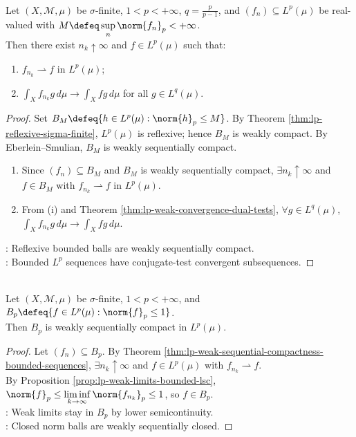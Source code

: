 \begin{theorem} \label{thm:lp-weak-sequential-compactness-bounded-sequences} \\
Let $(X,\mathcal M,\mu)$ be $\sigma$-finite, $1<p<+\infty$, $q=\frac{p}{p-1}$, and $(f_n)\subseteq L^p(\mu)$ be real-valued with $M\defeq\sup\limits_n\norm{f_n}_p<+\infty$.\\
Then there exist $n_k\uparrow\infty$ and $f\in L^p(\mu)$ such that:
\begin{enumerate}[label=(\roman*)]
\setlength{\itemsep}{0pt}
\item $f_{n_k}\rightharpoonup f$ in $L^p(\mu)$;
\item $\int_X f_{n_k}g\,d\mu\to\int_Xfg\,d\mu$ for all $g\in L^q(\mu)$.
\end{enumerate}
\begin{proof}
Set $B_M\defeq\{h\in L^p(\mu):\norm{h}_p\leq M\}$. By Theorem \ref{thm:lp-reflexive-sigma-finite}, $L^p(\mu)$ is reflexive; hence $B_M$ is weakly compact. By Eberlein--Smulian, $B_M$ is weakly sequentially compact.
\begin{enumerate}[label=(\roman*)]
\setlength{\itemsep}{0pt}
\item Since $(f_n)\subseteq B_M$ and $B_M$ is weakly sequentially compact, $\exists n_k\uparrow\infty$ and $f\in B_M$ with $f_{n_k}\rightharpoonup f$ in $L^p(\mu)$.
\item From (i) and Theorem \ref{thm:lp-weak-convergence-dual-tests}, $\forall g\in L^q(\mu)$, $\int_X f_{n_k}g\,d\mu\to\int_Xfg\,d\mu$.
\end{enumerate}
: Reflexive bounded balls are weakly sequentially compact.\\
: Bounded $L^p$ sequences have conjugate-test convergent subsequences.
\end{proof}
\end{theorem}

\begin{corollary} \label{cor:lp-closed-unit-ball-weakly-sequentially-compact} \\
Let $(X,\mathcal M,\mu)$ be $\sigma$-finite, $1<p<+\infty$, and $B_p\defeq\{f\in L^p(\mu):\norm{f}_p\leq1\}$.\\
Then $B_p$ is weakly sequentially compact in $L^p(\mu)$.
\begin{proof} Let $(f_n)\subseteq B_p$. By Theorem \ref{thm:lp-weak-sequential-compactness-bounded-sequences}, $\exists n_k\uparrow\infty$ and $f\in L^p(\mu)$ with $f_{n_k}\rightharpoonup f$.\\
By Proposition \ref{prop:lp-weak-limits-bounded-lsc}, $\norm{f}_p\leq\liminf\limits_{k\to\infty}\norm{f_{n_k}}_p\leq1$, so $f\in B_p$.\\
: Weak limits stay in $B_p$ by lower semicontinuity.\\
: Closed norm balls are weakly sequentially closed.
\end{proof}
\end{corollary}

